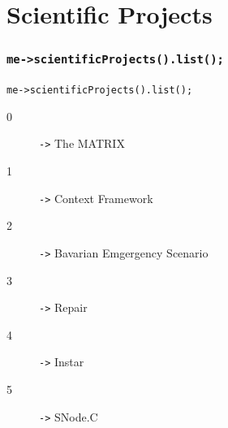 \part{Scientific Projects}
\section{\tt{me->scientificProjects().list();}}

\begin{frame}{\tt{me->scientificProjects().list();}}
  \begin{description}
    \item[0] {\texttt{->}} The MATRIX
    \item[1] {\texttt{->}} Context Framework
    \item[2] {\texttt{->}} Bavarian Emgergency Scenario
    \item[3] {\texttt{->}} Repair
    \item[4] {\texttt{->}} Instar
    \item[5] {\texttt{->}} SNode.C
  \end{description}
\end{frame}

